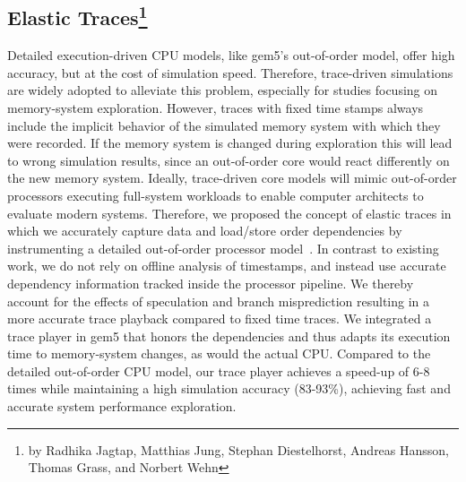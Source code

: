\subsection[Elastic Traces]{Elastic Traces\footnote{by Radhika Jagtap, Matthias Jung, Stephan Diestelhorst, Andreas Hansson, Thomas Grass, and Norbert Wehn}}
%
Detailed execution-driven CPU models, like gem5's out-of-order model, offer high accuracy, but at the cost of simulation speed.
Therefore, trace-driven simulations are widely adopted to alleviate this problem, especially for studies focusing on memory-system exploration.
However, traces with fixed time stamps always include the implicit behavior of the simulated memory system with which they were recorded.
If the memory system is changed during exploration this will lead to wrong simulation results, since an out-of-order core would react differently on the new memory system.
Ideally, trace-driven core models will mimic out-of-order processors executing full-system workloads to enable computer architects to evaluate modern systems.
Therefore, we proposed the concept of elastic traces in which we accurately capture data and load/store order dependencies by instrumenting a detailed out-of-order processor model~\cite{jagdie_16}.
In contrast to existing work, we do not rely on offline analysis of timestamps, and instead use accurate dependency information tracked inside the processor pipeline.
We thereby account for the effects of speculation and branch misprediction resulting in a more accurate trace playback compared to fixed time traces.
We integrated a trace player in gem5 that honors the dependencies and thus adapts its execution time to memory-system changes, as would the actual CPU. Compared to the detailed out-of-order CPU model, our trace player achieves a speed-up of 6-8 times while maintaining a high simulation accuracy (83-93\%), achieving fast and accurate system performance exploration.
